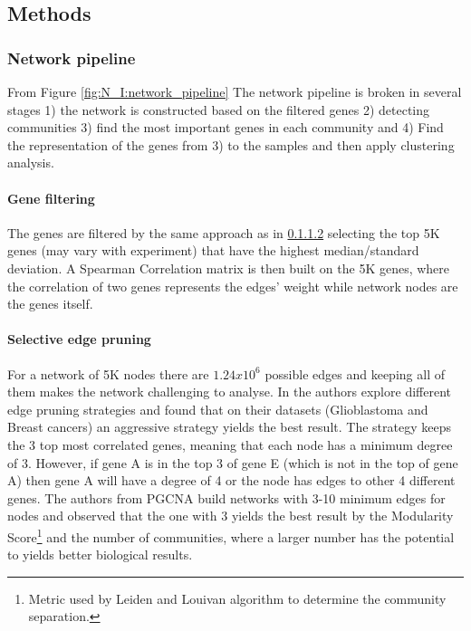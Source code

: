 \subsection{Methods} 

\subsubsection{Network pipeline}

From Figure \ref{fig:N_I:network_pipeline} The network pipeline is broken in several stages 1) the network is constructed based on the filtered genes 2) detecting  communities 3) find the most important genes in each community and 4) Find the representation of the genes from 3) to the samples and then apply clustering analysis. 


\paragraph{Gene filtering}
The genes are filtered by the same approach as in \ref{} selecting the top 5K genes (may vary with experiment) that have the highest median/standard deviation. A Spearman Correlation matrix is then built on the 5K genes, where the correlation of two genes represents the edges' weight while network nodes are the genes itself. 

\paragraph{Selective edge pruning}
For a network of 5K nodes there are $1.24x10^6$ possible edges and keeping all of them makes the network challenging to analyse. In \citet{Care2019-ij} the authors explore different edge pruning strategies and found that on their datasets (Glioblastoma and Breast cancers) an aggressive strategy yields the best result. The strategy keeps the 3 top most correlated genes, meaning that each node has a minimum degree of 3. However, if gene A is in the top 3 of gene E (which is not in the top of gene A) then gene A will have a degree of 4 or the node has edges to other 4 different genes. The authors from PGCNA build networks with 3-10 minimum edges for nodes and observed that the one with 3 yields the best result by the Modularity Score\footnote{Metric used by Leiden and Louivan algorithm to determine the community separation.} and the number of communities, where a larger number has the potential to yields better biological results.

